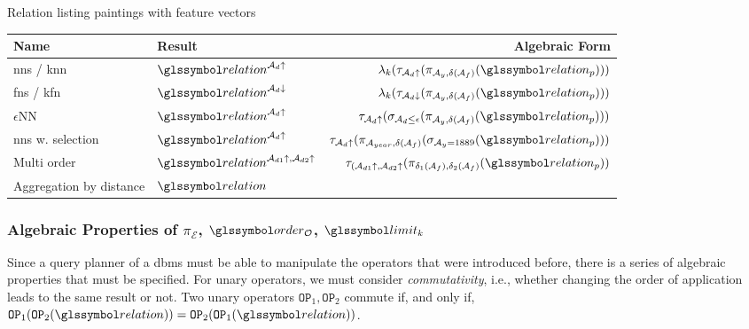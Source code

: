 \begin{example}[label=example:rel_painting_w_features]{Relation listing paintings with feature vectors}{}
    \begin{center}
        \begin{tabular}{||l l r ||} 
         \hline
         Name & Result & Algebraic Form \\
         \hline\hline
         \acrshort{nns} / \acrshort{knn} & $\relation^{\mathcal{A}_d\uparrow}$ & $\lambda_k (\tau_{\mathcal{A}_d\uparrow} ( \pi_{\mathcal{A}_{y}, \delta(\mathcal{A}_{f})}  ( \relation_p)))$  \\ 
         \hline
         \acrshort{fns} / \acrshort{kfn}& $\relation^{\mathcal{A}_d\downarrow}$ & $\lambda_k (\tau_{\mathcal{A}_d\downarrow} ( \pi_{\mathcal{A}_{y}, \delta(\mathcal{A}_{f})}  ( \relation_p)))$   \\
         \hline
         $\epsilon$NN~\cite{Giangreco:2018thesis} & $\relation^{\mathcal{A}_d\uparrow}$ & $\tau_{\mathcal{A}_d\uparrow} ( \sigma_{\mathcal{A}_d \leq \epsilon} ( \pi_{\mathcal{A}_{y}, \delta(\mathcal{A}_{f})} ( \relation_p)) )$  \\
         \hline
         \acrshort{nns} w. selection & $\relation^{\mathcal{A}_d\uparrow}$ &  $\tau_{\mathcal{A}_d\uparrow} ( \pi_{\mathcal{A}_{year}, \delta(\mathcal{A}_{f})} ( \sigma_{\mathcal{A}_{y} = 1889} ( \relation_p)) )$\\
         \hline
         Multi order & $\relation^{\mathcal{A}_{d1}\uparrow,\mathcal{A}_{d2}\uparrow}$ & $\tau_{(\mathcal{A}_{d1}\uparrow,\mathcal{A}_{d2}\uparrow} ( \pi_{\delta_1(\mathcal{A}_{f}), \delta_2(\mathcal{A}_{f})}  ( \relation_p))$ \\ 
         \hline
         Aggregation by distance & $\relation$ & \\ 
         \hline
        \end{tabular}
    \end{center}

\end{example}

\subsubsection{Algebraic Properties of  \texorpdfstring{$\pi_{\mathcal{E}}$}{Pi}, \texorpdfstring{$\order_{\mathcal{O}}$}{Tau}, \texorpdfstring{$\limit_k$}{Lambda}}

Since a query planner of a \acrshort{dbms} must be able to manipulate the operators that were introduced before, there is a series of algebraic properties that must be specified. For unary operators, we must consider \emph{commutativity}, i.e., whether changing the order of application leads to the same result or not. Two unary operators $\mathtt{OP}_1,\mathtt{OP}_2$ commute if, and only if, $ \mathtt{OP}_1 (\mathtt{OP}_2 ( \relation)) = \mathtt{OP}_2 (\mathtt{OP}_1 (\relation))$.

